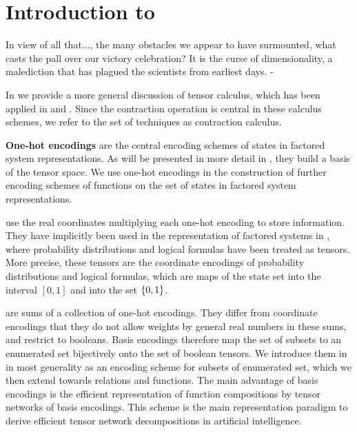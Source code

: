 \chapter{Introduction to }

\begin{highlight}
	In view of all that..., the many obstacles we appear to have surmounted, what casts the pall over our victory celebration?
	It is the curse of dimensionality, a malediction that has plagued the scientists from earliest days. - 
\end{highlight}

In  we provide a more general discussion of tensor calculus, which has been applied in  and .
Since the contraction operation is central in these calculus schemes, we refer to the set of techniques as contraction calculus.


\textbf{One-hot encodings} are the central encoding schemes of states in factored system representations.
As will be presented in more detail in , they build a basis of the tensor space.
We use one-hot encodings in the construction of further encoding schemes of functions on the set of states in factored system representations.

\textbf{\coordinateEncodings{}} use the real coordinates multiplying each one-hot encoding to store information.
They have implicitly been used in the representation of factored systems in , where probability distributions and logical formulas have been treated as tensors.
More precise, these tensors are the coordinate encodings of probability distributions and logical formulas, which are maps of the state set into the interval $[0,1]$ and into the set $\{0,1\}$.

\textbf{\basisEncodings{}} are sums of a collection of one-hot encodings.
They differ from coordinate encodings that they do not allow weights by general real numbers in these sums, and restrict to booleans.
Basis encodings therefore map the set of subsets to an enumerated set bijectively onto the set of boolean tensors.
We introduce them in  in most generality as an encoding scheme for subsets of enumerated set, which we then extend towards relations and functions.
The main advantage of basis encodings is the efficient representation of function compositions by tensor networks of basis encodings.
This scheme is the main representation paradigm to derive efficient tensor network decompositions in artificial intelligence.

